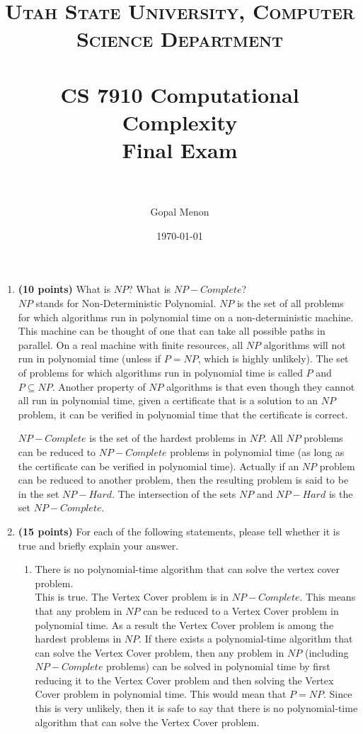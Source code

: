 \documentclass[paper=a4, fontsize=11pt]{scrartcl} %
\title{	
\normalfont \normalsize 
\textsc{Utah State University, Computer Science Department} \\ [25pt] %
\horrule{0.5pt} \\[0.4cm] %
\huge CS 7910 Computational Complexity\\Final Exam\\ %
\horrule{2pt} \\[0.5cm] %
}
\author{Gopal Menon} %
\date{\normalsize\today} %
\numberwithin{figure}{section} %
\numberwithin{table}{section} %
\begin{document}
\maketitle %

\begin{enumerate}
\item \textbf{(10 points)} What is $NP$? What is $NP-Complete$?\\

$NP$ stands for Non-Deterministic Polynomial. $NP$ is the set of all problems for which algorithms run in polynomial time on a non-deterministic machine. This machine can be thought of one that can take all possible paths in parallel. On a real machine with finite resources, all $NP$ algorithms will not run in polynomial time (unless if $P = NP$, which is highly unlikely). The set of problems for which algorithms run in polynomial time is called $P$ and $P \subseteq NP$. Another property of $NP$ algorithms is that even though they cannot all run in polynomial time, given a certificate that is a solution to an $NP$ problem, it can be verified in polynomial time that the certificate is correct.

$NP-Complete$ is the set of the hardest problems in $NP$. All $NP$ problems can be reduced to $NP-Complete$ problems in polynomial time (as long as the certificate can be verified in polynomial time). Actually if an $NP$ problem can be reduced to another problem, then the resulting problem is said to be in the set $NP-Hard$. The intersection of the sets $NP$ and $NP-Hard$ is the set $NP-Complete$.

\item \textbf{(15 points)} For each of the following statements, please tell whether it is true and briefly explain your answer.

\begin{enumerate}

\item There is no polynomial-time algorithm that can solve the vertex cover problem.\\

This is true. The Vertex Cover problem is in $NP-Complete$. This means that any problem in $NP$ can be reduced to a Vertex Cover problem in polynomial time. As a result the Vertex Cover problem is among the hardest problems in $NP$. If there exists a polynomial-time algorithm that can solve the Vertex Cover problem, then any problem in $NP$ (including $NP-Complete$ problems) can be solved in polynomial time by first reducing it to the Vertex Cover problem and then solving the Vertex Cover problem in polynomial time. This would mean that $P = NP$. Since this is very unlikely, then it is safe to say that there is no polynomial-time algorithm that can solve the Vertex Cover problem.


\end{enumerate}
\end{enumerate}
\end{document}
